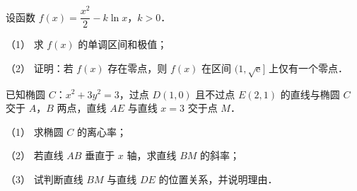 \begin{question}
设函数 \(f(x)=\dfrac{x^{2}}{2}-k\ln x\)，\(k>0\)．

（1） 求 \(f(x)\) 的单调区间和极值；

（2） 证明：若 \(f(x)\) 存在零点，则 \(f(x)\) 在区间 \((1,\sqrt{\mathrm{e}}]\) 上仅有一个零点．

\end{question}
\begin{question}
已知椭圆 \(C\)：\(x^{2}+3y^{2}=3\)，过点 \(D(1,0)\) 且不过点 \(E(2,1)\) 的直线与椭圆 \(C\) 交于 \(A\)，\(B\) 两点，直线 \(AE\) 与直线 \(x=3\) 交于点 \(M\)．

（1） 求椭圆 \(C\) 的离心率；

（2） 若直线 \(AB\) 垂直于 \(x\) 轴，求直线 \(BM\) 的斜率；

（3） 试判断直线 \(BM\) 与直线 \(DE\) 的位置关系，并说明理由．

\end{question}